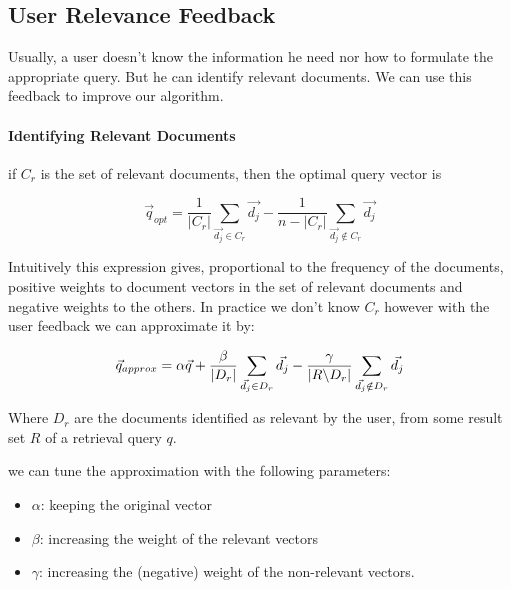 \subsection{User Relevance Feedback}

Usually, a user doesn't know the information he need nor how to formulate the appropriate query. But he can identify relevant documents. We can use this feedback to improve our algorithm.
\paragraph{Identifying Relevant Documents}
if $C_r$ is the set of relevant documents, then the optimal query vector is 

\[ \vec{q}_{opt} = \frac{1}{|C_r|} \sum_{\vec{d_j} \in C_r} \vec{d_j} - \frac{1}{n-|C_r|} \sum_{\vec{d_j} \not \in C_r} \vec{d_j} \]

Intuitively this expression gives, proportional to the frequency of the documents, positive weights to document vectors in the set of relevant documents and negative weights to the others. In practice we don't know $C_r$ however with the user feedback we can approximate it by:

\[ \vec{q}_{approx} = \alpha\vec{q} + \frac{\beta}{|D_r|}\sum_{\vec{d_j} \in D_r} \vec{d_j} - \frac{\gamma}{\abs{R\symbol{92}D_r}} \sum_{\vec{d_j} \notin D_r} \vec{d_j} \]

Where $D_r$ are the documents identified as relevant by the user, from some result set $R$ of a retrieval query $q$.

we can tune the approximation with the following parameters:
\begin{itemize}
\item $\alpha$: keeping the original vector
\item $\beta$: increasing the weight of the relevant vectors
\item $\gamma$: increasing the (negative) weight of the non-relevant vectors.
\end{itemize}

